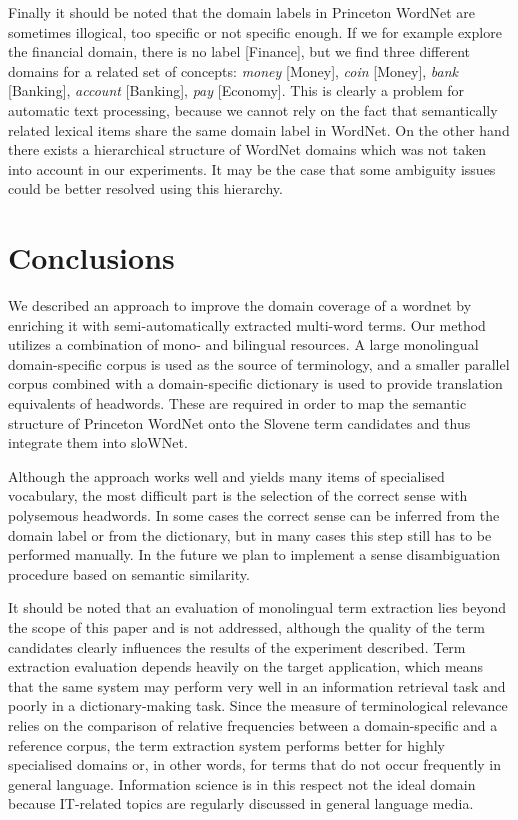 \documentclass[output=paper]{LSP/langsci}
\begin{document}
Finally it should be noted that the domain labels in Princeton WordNet are sometimes illogical, too specific or not specific enough. If we for example explore the financial domain, there is no label [Finance], but we find three different domains for a related set of concepts: \textit{money} [Money], \textit{coin} [Money], \textit{bank} [Banking], \textit{account} [Banking], \textit{pay} [Economy]. This is clearly a problem for automatic text processing, because we cannot rely on the fact that semantically related lexical items share the same domain label in WordNet. On the other hand there exists a hierarchical structure of WordNet domains which was not taken into account in our experiments. It may be the case that some ambiguity issues could be better resolved using this hierarchy.

\section{Conclusions}\label{sec:vintar:6}

We described an approach to improve the domain coverage of a wordnet by enriching it with semi-automatically extracted multi-word terms. Our method utilizes a combination of mono- and bilingual resources. A large monolingual domain-specific corpus is used as the source of terminology, and a smaller parallel corpus combined with a domain-specific dictionary is used to provide translation equivalents of headwords. These are required in order to map the semantic structure of Princeton WordNet onto the Slovene term candidates and thus integrate them into sloWNet. 

Although the approach works well and yields many items of specialised vocabulary, the most difficult part is the selection of the correct sense with polysemous headwords. In some cases the correct sense can be inferred from the domain label or from the dictionary, but in many cases this step still has to be performed manually. In the future we plan to implement a sense disambiguation procedure based on semantic similarity.

It should be noted that an evaluation of monolingual term extraction lies beyond the scope of this paper and is not addressed, although the quality of the term candidates clearly influences the results of the experiment described. Term extraction evaluation depends heavily on the target application, which means that the same system may perform very well in an information retrieval task and poorly in a dictionary-making task. Since the measure of terminological relevance relies on the comparison of relative frequencies between a domain-specific and a reference corpus, the term extraction system performs better for highly specialised domains or, in other words, for terms that do not occur frequently in general language. Information science is in this respect not the ideal domain because IT-related topics are regularly discussed in general language media.
\end{document}
